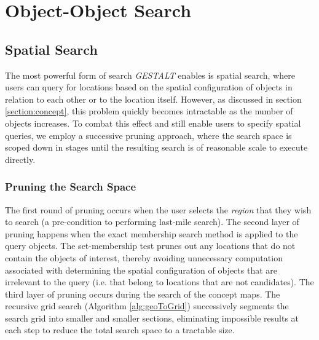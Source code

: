 \section{Object-Object Search}
\label{section:obj_search}


\subsection{Spatial Search}

The most powerful form of search \emph{GESTALT} enables is spatial search, where users can query for locations based on the spatial configuration of objects in relation to each other or to the location itself.
However, as discussed in section \ref{section:concept}, this problem quickly becomes intractable as the number of objects increases.
To combat this effect and still enable users to specify spatial queries, we employ a successive pruning approach, where the search space is scoped down in stages until the resulting search is of reasonable scale to execute directly.

\subsubsection{Pruning the Search Space}
The first round of pruning occurs when the user selects the \emph{region} that they wish to search (a pre-condition to performing last-mile search). 
The second layer of pruning happens when the exact membership search method is applied to the query objects.
The set-membership test prunes out any locations that do not contain the objects of interest, thereby avoiding unnecessary computation associated with determining the spatial configuration of objects that are irrelevant to the query (i.e. that belong to locations that are not candidates).
The third layer of pruning occurs during the search of the concept maps. 
The recursive grid search (Algorithm \ref{alg:geoToGrid}) successively segments the search grid into smaller and smaller sections, eliminating impossible results at each step to reduce the total search space to a tractable size.

